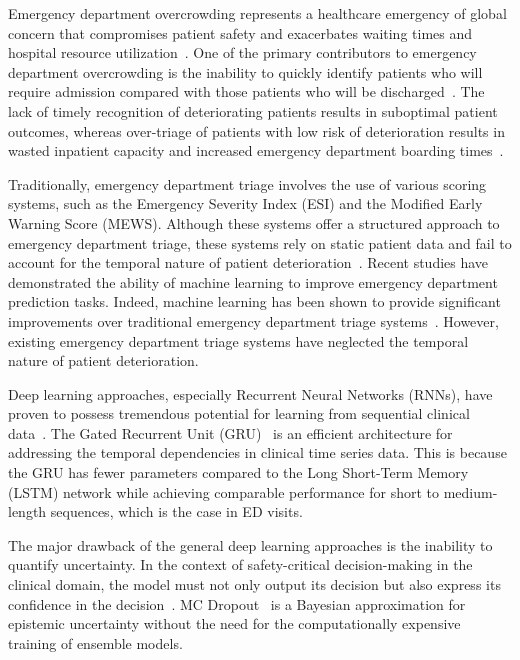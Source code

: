 \documentclass[conference]{IEEEtran}
\begin{document}
Emergency department overcrowding represents a healthcare emergency of global concern that compromises patient safety and exacerbates waiting times and hospital resource utilization~\cite{Hoot2008}. One of the primary contributors to emergency department overcrowding is the inability to quickly identify patients who will require admission compared with those patients who will be discharged~\cite{Peck2012}. The lack of timely recognition of deteriorating patients results in suboptimal patient outcomes, whereas over-triage of patients with low risk of deterioration results in wasted inpatient capacity and increased emergency department boarding times~\cite{Morley2018}.

Traditionally, emergency department triage involves the use of various scoring systems, such as the Emergency Severity Index (ESI) and the Modified Early Warning Score (MEWS). Although these systems offer a structured approach to emergency department triage, these systems rely on static patient data and fail to account for the temporal nature of patient deterioration~\cite{Levin2018}. Recent studies have demonstrated the ability of machine learning to improve emergency department prediction tasks. Indeed, machine learning has been shown to provide significant improvements over traditional emergency department triage systems~\cite{Raita2019, Hong2018}. However, existing emergency department triage systems have neglected the temporal nature of patient deterioration.

Deep learning approaches, especially Recurrent Neural Networks (RNNs), have proven to possess tremendous potential for learning from sequential clinical data~\cite{Rajkomar2018, Choi2016}. The Gated Recurrent Unit (GRU)~\cite{Cho2014} is an efficient architecture for addressing the temporal dependencies in clinical time series data. This is because the GRU has fewer parameters compared to the Long Short-Term Memory (LSTM) network while achieving comparable performance for short to medium-length sequences, which is the case in ED visits.

The major drawback of the general deep learning approaches is the inability to quantify uncertainty. In the context of safety-critical decision-making in the clinical domain, the model must not only output its decision but also express its confidence in the decision~\cite{Begoli2019}. MC Dropout~\cite{Gal2016} is a Bayesian approximation for epistemic uncertainty without the need for the computationally expensive training of ensemble models.
\end{document}

